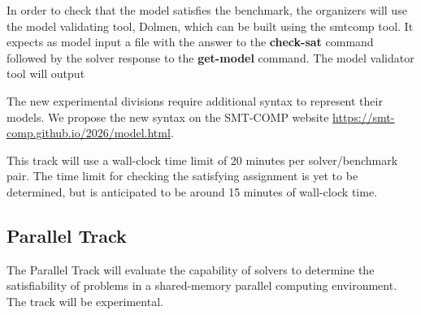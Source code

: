 \documentclass[12pt]{article}
\newcommand{\akey}[1]{\textbf{#1}\xspace}
\newcommand{\paralleltrack}{Parallel Track\xspace}
\begin{document}
In order to check that the model satisfies the benchmark, the organizers will
use the model validating tool, Dolmen, which can be built using the smtcomp tool.
It expects as model input a file with the answer to the \akey{check-sat}
command followed by the solver response to the \akey{get-model} command.
The model validator tool will output

The new experimental divisions require additional syntax to represent
their models.  We propose the new syntax on the SMT-COMP website
{\url{https://smt-comp.github.io/2026/model.html}}.

This track will use a wall-clock time limit of 20 minutes per solver/benchmark
pair. The time limit for checking the satisfying assignment is yet to be
determined, but is anticipated to be around 15 minutes of wall-clock time.


\subsection{\paralleltrack{}}
The \paralleltrack{} will evaluate the capability of solvers to
determine the satisfiability of problems in a shared-memory parallel
computing environment.  The track will be experimental.
\end{document}

